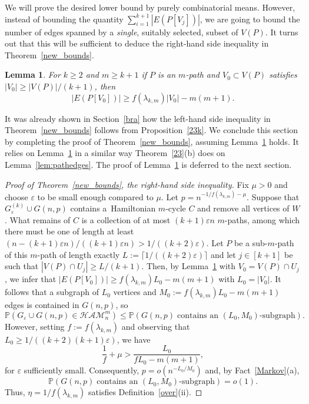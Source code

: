 \documentclass[reqno, 12pt]{amsart}
\numberwithin{equation}{section}
\numberwithin{figure}{section}
\let\epsilon=\varepsilon
\let\eps=\epsilon
\def\PP{{\mathds P}}
\let\Prob=\PP
\newcommand{\ham}{\mathcal{HAM}}
\theoremstyle{plain}
\newtheorem{lemma}[thm]{Lemma}
\theoremstyle{definition}
\begin{document}
We will prove the desired lower bound by purely combinatorial means. However, instead of bounding the quantity $\sum_{i=1}^{k+1}|E(P[V_{j}])|$,
we are going to bound the number of edges spanned by a \emph{single}, suitably selected,  subset of $V(P)$. It turns out that this will be sufficient to deduce the right-hand side inequality in Theorem~\ref{new_bounds}.

\begin{lemma}\label{weak}
For $k\ge 2$ and $m\geq k+1$ if $P$ is an $m$-path and $V_0\subset V(P)$ satisfies
$|V_0|\ge|V(P)|/(k+1)$, then
\[
    |E(P[V_{0}])|\geq f(\lambda_{k,m})|V_{0}| -  m(m+1).
\]
\end{lemma}

 It was already shown in Section~\ref{bra} how the left-hand side inequality in Theorem~\ref{new_bounds} follows from Proposition~\ref{23k}.
We conclude this section by completing the proof of Theorem~\ref{new_bounds}, assuming Lemma~\ref{weak} holds. It relies on Lemma~\ref{weak} in a similar way Theorem~\ref{23}(b) does on Lemma~\ref{lem:pathedges}.  The proof of Lemma~\ref{weak} is deferred to the next section.

\begin{proof}[Proof of Theorem~\ref{new_bounds}, the right-hand side inequality]
Fix $\mu>0$ and choose $\eps$ to be small enough compared to $\mu$.
 Let $p=n^{-1/f(\lambda_{k,m})-\mu}$. Suppose that $G_\eps^{(k)}\cup G(n,p)$ contains a~Hamiltonian $m$-cycle $C$ and remove all vertices of $W$. What remains of $C$ is a collection of at most $(k+1)\eps n$ $m$-paths, among which there must be one of length at least $(n-(k+1)\eps n)/((k+1)\eps n)>1/((k+2)\eps)$. Let $P$ be a sub-$m$-path of this $m$-path of length exactly $L:=\lceil 1/((k+2)\eps)\rceil$ and let $j\in[k+1]$ be such that $|V(P)\cap U_j|\ge L/(k+1)$. Then, by Lemma~\ref{weak} with $V_0=V(P)\cap U_j$, we infer that $|E(P[V_{0}])|\geq f(\lambda_{k,m})L_0 - m(m+1)$ with $L_0=|V_0|$. It follows that
 a subgraph of $L_0$ vertices and $M_0:=f(\lambda_{k,m})L_0- m(m+1)$ edges is contained in $G(n,p)$, so
$$\Prob(G_\eps\cup G(n,p)\in\ham^m_n)\le\Prob(G(n,p)\;\mbox{contains an $(L_0,M_0)$-subgraph}).$$
  However, setting $f:=f(\lambda_{k,m})$ and observing that $L_0\ge 1/((k+2)(k+1)\eps)$,
  we have
  $$\frac1f+\mu>\frac{L_0}{fL_0-m(m+1)},$$
  for $\eps$ sufficiently small.
   Consequently, $p=o(n^{-L_0/M_0})$ and, by Fact~\ref{Markov}(a),
  $$\Prob(G(n,p)\;\mbox{contains an $(L_0,M_0)$-subgraph})=o(1).$$
 Thus, $\eta=1/f(\lambda_{k,m})$ satisfies Definition~\ref{over}(ii).
\end{proof}
\end{document}

